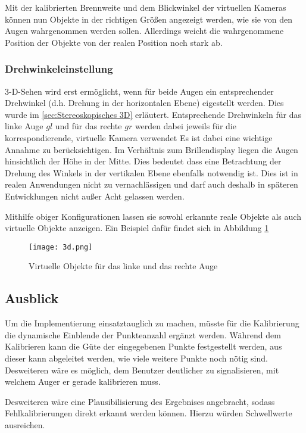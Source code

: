%
Mit der kalibrierten Brennweite und dem Blickwinkel der virtuellen Kameras können nun Objekte in der richtigen Größen angezeigt werden, wie sie von den Augen wahrgenommen werden sollen. Allerdings weicht die wahrgenommene Position der Objekte von der realen Position noch stark ab. 

\subsubsection{Drehwinkeleinstellung}
3-D-Sehen wird erst ermöglicht, wenn für beide Augen ein entsprechender Drehwinkel (d.h. Drehung in der horizontalen Ebene) eigestellt werden. Dies wurde im \ref{sec:Stereoskopisches 3D} erläutert.  Entsprechende Drehwinkeln für das linke Auge $gl$ und für das rechte $gr$ werden dabei jeweils für die korrespondierende, virtuelle Kamera verwendet
Es ist dabei eine wichtige Annahme zu berücksichtigen. Im Verhältnis zum Brillendisplay liegen die Augen hinsichtlich der Höhe in der Mitte. Dies bedeutet dass eine Betrachtung der Drehung des Winkels in der vertikalen Ebene ebenfalls notwendig ist. Dies ist in realen Anwendungen nicht zu vernachlässigen und darf auch deshalb in späteren Entwicklungen nicht außer Acht gelassen werden.

Mithilfe obiger Konfigurationen lassen sie sowohl erkannte reale Objekte als auch virtuelle Objekte anzeigen.  Ein Beispiel dafür findet sich in Abbildung \ref{fig:Virtuelle Quadrate aus Prezi}

\begin{figure}[h]
   \centering
   \texttt{[image: 3d.png]}
   \caption{Virtuelle Objekte für das linke und das rechte Auge}
   \label{fig:Virtuelle Quadrate aus Prezi}
\end{figure}

\subsection{Ausblick}
Um die Implementierung einsatztauglich zu machen, müsste für die Kalibrierung die dynamische Einblende der Punkteanzahl ergänzt werden. Während dem Kalibrieren kann die Güte der eingegebenen Punkte festgestellt werden, aus dieser kann abgeleitet werden, wie viele weitere Punkte noch nötig sind. Desweiteren wäre es möglich, dem Benutzer deutlicher zu signalisieren, mit welchem Auger er gerade kalibrieren muss.

Desweiteren wäre eine Plausibilisierung des Ergebnises angebracht, sodass Fehlkalibrierungen direkt erkannt werden können. Hierzu würden Schwellwerte ausreichen.

